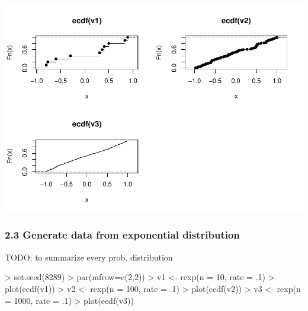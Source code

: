 \documentclass[
]{article}
\newenvironment{Shaded}{\begin{snugshade}}{\end{snugshade}}
\newcommand{\AttributeTok}[1]{\textcolor[rgb]{0.77,0.63,0.00}{#1}}
\newcommand{\DecValTok}[1]{\textcolor[rgb]{0.00,0.00,0.81}{#1}}
\newcommand{\FunctionTok}[1]{\textcolor[rgb]{0.00,0.00,0.00}{#1}}
\newcommand{\NormalTok}[1]{#1}
\newcommand{\OtherTok}[1]{\textcolor[rgb]{0.56,0.35,0.01}{#1}}
\newcommand{\SpecialCharTok}[1]{\textcolor[rgb]{0.00,0.00,0.00}{#1}}
\begin{document}
\includegraphics[width=1\linewidth,height=0.5\textheight]{R_Tricks_For_ComputationStats_files/figure-latex/unnamed-chunk-2-1}

\hypertarget{generate-data-from-exponential-distribution}{%
\subsubsection{2.3 Generate data from exponential
distribution}\label{generate-data-from-exponential-distribution}}

TODO: to summarize every prob. distribution

\begin{Shaded}
\begin{Highlighting}[]
\SpecialCharTok{\textgreater{}} \FunctionTok{set.seed}\NormalTok{(}\DecValTok{8289}\NormalTok{)}
\SpecialCharTok{\textgreater{}} \FunctionTok{par}\NormalTok{(}\AttributeTok{mfrow=}\FunctionTok{c}\NormalTok{(}\DecValTok{2}\NormalTok{,}\DecValTok{2}\NormalTok{))}
\SpecialCharTok{\textgreater{}}\NormalTok{ v1 }\OtherTok{\textless{}{-}} \FunctionTok{rexp}\NormalTok{(}\AttributeTok{n =} \DecValTok{10}\NormalTok{, }\AttributeTok{rate =}\NormalTok{ .}\DecValTok{1}\NormalTok{)}
\SpecialCharTok{\textgreater{}} \FunctionTok{plot}\NormalTok{(}\FunctionTok{ecdf}\NormalTok{(v1))}
\SpecialCharTok{\textgreater{}}\NormalTok{ v2 }\OtherTok{\textless{}{-}} \FunctionTok{rexp}\NormalTok{(}\AttributeTok{n =} \DecValTok{100}\NormalTok{, }\AttributeTok{rate =}\NormalTok{ .}\DecValTok{1}\NormalTok{)}
\SpecialCharTok{\textgreater{}} \FunctionTok{plot}\NormalTok{(}\FunctionTok{ecdf}\NormalTok{(v2))}
\SpecialCharTok{\textgreater{}}\NormalTok{ v3 }\OtherTok{\textless{}{-}} \FunctionTok{rexp}\NormalTok{(}\AttributeTok{n =} \DecValTok{1000}\NormalTok{, }\AttributeTok{rate =}\NormalTok{ .}\DecValTok{1}\NormalTok{)}
\SpecialCharTok{\textgreater{}} \FunctionTok{plot}\NormalTok{(}\FunctionTok{ecdf}\NormalTok{(v3))}
\end{Highlighting}
\end{Shaded}
\end{document}
